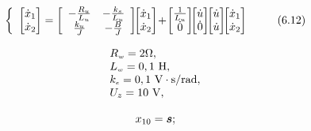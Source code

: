 \documentclass{article}
\begin{document}
\[
$$
\left\{\begin{array} {l} {\left[ \begin{matrix} {\dot{x}_{1}} \\ {\dot{x}_{2}} \\ \end{matrix} \right]=\left[ \begin{array} {c c} {-\frac{R_{u}} {L_{u}}} & {-\frac{k_{s}} {L_{u}}} \\ {\frac{k_{u}} {J}} & {-\frac{B} {J}} \\ \end{array} \right] \! \! \left[ \begin{matrix} {\dot{x}_{1}} \\ {\dot{x}_{2}} \\ \end{matrix} \right] \!+\! \left[ \begin{matrix} {\frac{1} {L_{u}}} \\ {\dot{0}} \\ \end{matrix} \right] \! \! \left[ \begin{matrix} {\dot{u}} \\ {\dot{0}} \\ \end{matrix} \right] \! \! \left[ \begin{matrix} {\dot{u}} \\ {\dot{u}} \\ \end{matrix} \right] \! \! \left[ \begin{matrix} {\dot{x}_{1}} \\ {\dot{x}_{2}} \\ \end{matrix} \right]} \\ \end{array} \right. \tag{6.12}
$$
\]

\[
$$
\begin{array} {l} {R_{\scriptscriptstyle w}=2 \Omega,} \\ {L_{\scriptscriptstyle w}=0, 1 \mathrm{~ H,}} \\ {k_{\scriptscriptstyle e}=0, 1 \mathrm{~ V \cdot s / r a d,}} \\ {U_{z}=1 0 \mathrm{~ V,}} \end{array}
$$
\]

\[
$$
x_{1 0}=\boldsymbol{s} ;
$$
\]
\end{document}
